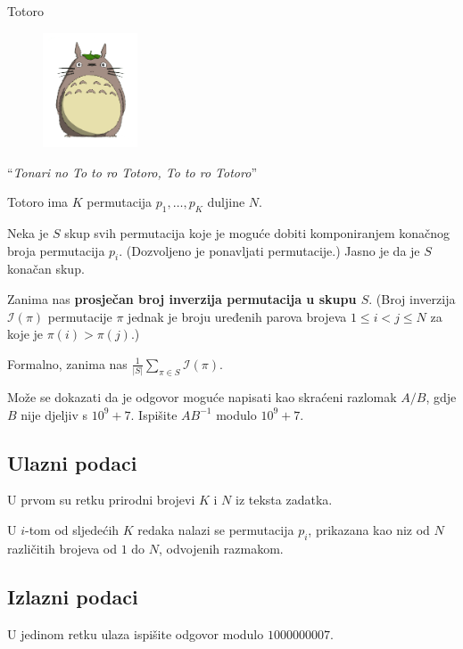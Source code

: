 \begin{statement}[
  problempoints=100,
  timelimit=1 sekunda,
  memorylimit=512 MiB,
]{Totoro}

\setlength\intextsep{-0.1cm}
\begin{figure}
\centering
\includegraphics[width=0.25\textwidth]{img/totoro.png}
\end{figure}

``\textit{Tonari no To to ro Totoro, To to ro Totoro}'' 

Totoro ima $K$ permutacija $p_1, \ldots, p_K$ duljine $N$.

Neka je $S$ skup svih permutacija koje je moguće
dobiti komponiranjem konačnog broja permutacija $p_i$.
(Dozvoljeno je ponavljati permutacije.)
Jasno je da je $S$ konačan skup.

Zanima nas \textbf{prosječan broj inverzija permutacija u skupu $S$}.
(Broj inverzija $\mathcal{I}(\pi)$ permutacije $\pi$ 
jednak je broju uređenih parova
brojeva $1 \le i < j \le N$ za koje je $\pi(i) > \pi(j)$.)

Formalno, zanima nas $\frac{1}{|S|} \sum_{\pi \in S} \mathcal{I} (\pi)$.

Može se dokazati da je odgovor moguće napisati
kao skraćeni razlomak $A/B$, gdje $B$ nije djeljiv s $10^9 + 7$. 
Ispišite $AB^{-1}$ modulo $10^9 + 7$.
\subsection*{Ulazni podaci}
U prvom su retku prirodni brojevi $K$ i $N$ iz teksta zadatka.

U $i$-tom od sljedećih $K$ redaka nalazi se permutacija $p_i$, 
prikazana kao niz od $N$ različitih brojeva od $1$ do $N$, odvojenih razmakom.

\subsection*{Izlazni podaci}
U jedinom retku ulaza ispišite odgovor modulo $1 000 000 007$. 



\end{statement}
